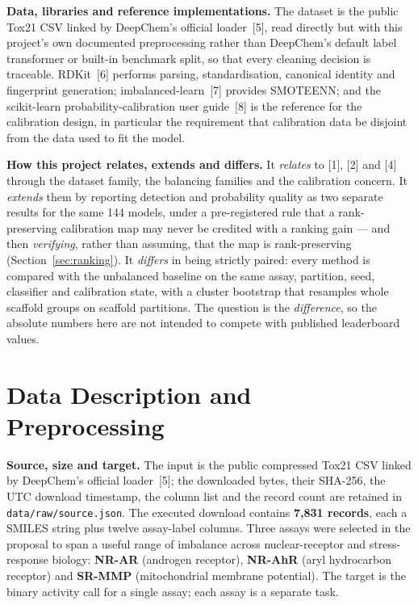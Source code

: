\documentclass[10pt,letterpaper]{article}
\begin{document}
\textbf{Data, libraries and reference implementations.} The dataset is the public Tox21 CSV linked
by DeepChem's official loader~[5], read directly but with this project's own documented
preprocessing rather than DeepChem's default label transformer or built-in benchmark split, so that
every cleaning decision is traceable. RDKit~[6] performs parsing, standardisation, canonical
identity and fingerprint generation; imbalanced-learn~[7] provides SMOTEENN; and the scikit-learn
probability-calibration user guide~[8] is the reference for the calibration design, in particular
the requirement that calibration data be disjoint from the data used to fit the model.

\textbf{How this project relates, extends and differs.} It \emph{relates} to [1], [2] and [4]
through the dataset family, the balancing families and the calibration concern. It \emph{extends}
them by reporting detection and probability quality as two separate results for the same 144 models,
under a pre-registered rule that a rank-preserving calibration map may never be credited with a
ranking gain --- and then \emph{verifying}, rather than assuming, that the map is rank-preserving
(Section~\ref{sec:ranking}). It \emph{differs} in being strictly paired: every method is compared
with the unbalanced baseline on the same assay, partition, seed, classifier and calibration state,
with a cluster bootstrap that resamples whole scaffold groups on scaffold partitions. The question
is the \emph{difference}, so the absolute numbers here are not intended to compete with published
leaderboard values.

\section{Data Description and Preprocessing}

\textbf{Source, size and target.} The input is the public compressed Tox21 CSV linked by DeepChem's
official loader~[5]; the downloaded bytes, their SHA-256, the UTC download timestamp, the column
list and the record count are retained in \texttt{data/raw/source.json}. The executed download
contains \textbf{7{,}831 records}, each a SMILES string plus twelve assay-label columns. Three
assays were selected in the proposal to span a useful range of imbalance across nuclear-receptor and
stress-response biology: \textbf{NR-AR} (androgen receptor), \textbf{NR-AhR} (aryl hydrocarbon
receptor) and \textbf{SR-MMP} (mitochondrial membrane potential). The target is the binary activity
call for a single assay; each assay is a separate task.
\end{document}

